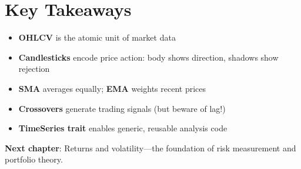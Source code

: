 \section{Key Takeaways}

\begin{itemize}
    \item \textbf{OHLCV} is the atomic unit of market data
    \item \textbf{Candlesticks} encode price action: body shows direction,
      shadows show rejection
    \item \textbf{SMA} averages equally; \textbf{EMA} weights recent prices
    \item \textbf{Crossovers} generate trading signals (but beware of lag!)
    \item \textbf{TimeSeries trait} enables generic, reusable analysis code
\end{itemize}

\vspace{1em}
\noindent\textbf{Next chapter}: Returns and volatility---the foundation of risk
measurement and portfolio theory.
